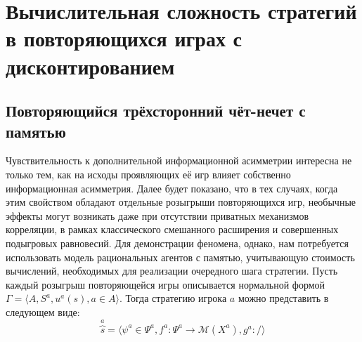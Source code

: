 \chapter{Вычислительная сложность стратегий в повторяющихся играх с дисконтированием}\label{ch:ch3}

\section{Повторяющийся трёхсторонний чёт-нечет с памятью}\label{sec:ch3/sect1}

Чувствительность к дополнительной информационной асимметрии интересна не только тем, как на исходы проявляющих её игр влияет собственно информационная асимметрия. Далее будет показано, что в тех случаях, когда этим свойством обладают отдельные розыгрыши повторяющихся игр, необычные эффекты могут возникать даже при отсутствии приватных механизмов корреляции, в рамках классического смешанного расширения и совершенных подыгровых равновесий. Для демонстрации феномена, однако, нам потребуется использовать модель рациональных агентов с памятью, учитывающую стоимость вычислений, необходимых для реализации очередного шага стратегии. Пусть каждый розыгрыш повторяющейся игры описывается нормальной формой $\Gamma = \langle A, S^a, u^a(s), a \in A \rangle$. Тогда стратегию игрока $a$ можно представить в следующем виде:
\begin{equation*}
	\overbrace{s}^a = \langle \psi^a \in \Psi^a, f^a : \Psi^a \rightarrow \mathcal{M}(X^a), g^a :  / \rangle
\end{equation*}

\clearpage
